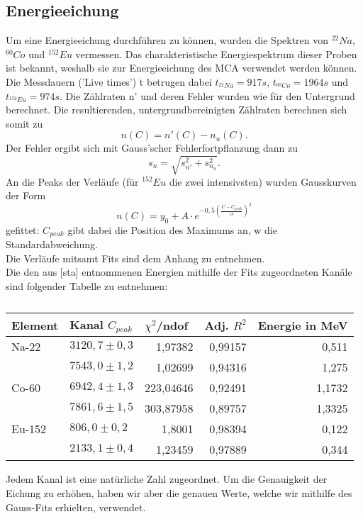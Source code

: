  \subsection{Energieeichung}
 Um eine Energieeichung durchführen zu können, wurden die Spektren von $^{22}Na$, $^{60}Co$ und $^{152}Eu$ vermessen. Das charakteristische Energiespektrum dieser Proben ist bekannt, weshalb sie zur Energieeichung des MCA verwendet werden können. Die Messdauern ('Live times') t betrugen dabei $t_{^{22}Na}=917 s$, $t_{^{60}Co}=1964 s$ und $t_{^{152}Eu}=974 s$. Die Zählraten n' und deren Fehler wurden wie für den Untergrund berechnet. Die resultierenden, untergrundbereinigten Zählraten berechnen sich somit zu \[n(C)=n'(C)-n_{u}(C).\] Der Fehler ergibt sich mit Gauss'scher Fehlerfortpflanzung dann zu 
 \[s_{n}=\sqrt{s_{n'}^{2}+s_{n_{u}}^{2}}.\]
 An die Peaks der Verläufe (für $^{152}Eu$ die zwei intensivsten) wurden Gausskurven der Form 
 \[n(C)=y_{0}+A\cdot e^{-0,5(\frac{C-C_{peak}}{w})^{2}}\]
  gefittet: $C_{peak}$ gibt dabei die Position des Maximums an, w die Standardabweichung. \\
  Die Verläufe mitsamt Fits sind dem Anhang zu entnehmen. \\
  Die den aus [sta] entnommenen Energien mithilfe der Fits zugeordneten Kanäle sind folgender Tabelle zu entnehmen:\\
  \begin{table}[htbp]
  \begin{center}
  \caption{}
  \begin{tabular}{|l|l|r|r|r|}
  \hline
  Element & Kanal $C_{peak}$ & \multicolumn{1}{l|}{$\chi^2$/ndof} & \multicolumn{1}{l|}{Adj. $R^2$} & \multicolumn{1}{l|}{Energie in MeV} \\ \hline
  Na-22 & $3120,7\pm0,3$ & 1,97382 & 0,99157 & 0,511 \\ \hline
   & $7543,0\pm1,2$ & 1,02699 & 0,94316 & 1,275 \\ \hline
  Co-60 & $6942,4\pm1,3$ & 223,04646 & 0,92491 & 1,1732 \\ \hline
   & $7861,6\pm1,5$ & 303,87958 & 0,89757 & 1,3325 \\ \hline
  Eu-152 & $806,0\pm0,2$ & 1,8001 & 0,98394 & 0,122 \\ \hline
   & $2133,1\pm0,4$ & 1,23459 & 0,97889 & 0,344 \\ \hline
  \end{tabular}
  \label{}
  \end{center}
  \end{table}
  Jedem Kanal ist eine natürliche Zahl zugeordnet. Um die Genauigkeit der Eichung zu erhöhen, haben wir aber die genauen Werte, welche wir mithilfe des Gauss-Fits erhielten, verwendet. \\

